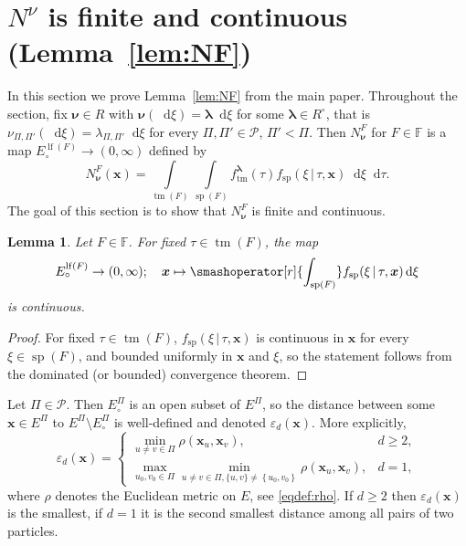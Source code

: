 \documentclass[reqno,draft]{amsart}
\numberwithin{equation}{section}
\theoremstyle{plain}
\newtheorem{lemma}[theorem]{Lemma}
\theoremstyle{remark}
\newcommand*\diff{\mathop{}\!\mathrm{d}}
\newcommand{\fpart}{\Pi} %
\newcommand{\rates}{R^\circ} %
\newcommand{\nurates}{R} %
\DeclareMathOperator{\lf}{lf}
\DeclareMathOperator{\dct}{tm}
\DeclareMathOperator{\dcs}{sp}
\newcommand{\ftm}{f_\mathrm{tm}^{\boldsymbol \lambda}}
\newcommand{\fsp}{f_\mathrm{sp}}
\begin{document}
\section{$N^{\nu}$ is finite and continuous (Lemma~\ref{lem:NF})}
In this section we prove Lemma~\ref{lem:NF} from the main paper.
\lemNF*
Throughout the section, fix $\boldsymbol \nu \in \nurates$ with $\boldsymbol \nu(\diff \xi) = \boldsymbol \lambda \diff \xi$ for some $\boldsymbol \lambda \in \rates$, that is $\nu_{\fpart,\fpart'}(\diff \xi) = \lambda_{\fpart,\fpart'} \diff \xi$ for every $\fpart,\fpart'\in \mathcal{P}$, $\fpart' < \fpart$. Then $N^F_{\boldsymbol \nu}$ for $F\in \mathbb{F}$ is a map $E^{\lf(F)}_\circ \to (0,\infty)$ defined by \[
    N^F_{\boldsymbol \nu}(\boldsymbol x) = \int\limits_{\dct(F)} \int\limits_{\dcs(F)} \ftm(\tau) \fsp(\xi \,\vert\,\tau,\boldsymbol x) \diff \xi \diff \tau.
\] The goal of this section is to show that $N^F_{\boldsymbol \nu}$ is finite and continuous.
\begin{lemma}\label{lem:NFinnerintegralcontinuous}
    Let $F\in \mathbb{F}$. For fixed $\tau \in \dct(F)$, the map \[
        E^{\lf(F)}_\circ \to (0,\infty);\quad \boldsymbol x \mapsto \smashoperator[r]{\int_{\dcs(F)}} \fsp(\xi \,\vert\,\tau,\boldsymbol x) \diff \xi
    \] is continuous.
\end{lemma}
\begin{proof}
    For fixed $\tau \in \dct(F)$, $\fsp(\xi \,\vert\,\tau,\boldsymbol x)$ is continuous in $\boldsymbol x$ for every $\xi \in \dcs(F)$, and bounded uniformly in $\boldsymbol x$ and $\xi$, so the statement follows from the dominated (or bounded) convergence theorem.
\end{proof}

Let $\fpart\in \mathcal{P}$. Then $E^{\fpart}_\circ $ is an open subset of $E^\fpart$, so the distance between some $\boldsymbol x\in E^\fpart$ to $E^\fpart \setminus E^\fpart_\circ $ is well-defined and denoted $\varepsilon_d(\boldsymbol x)$. More explicitly,
\begin{equation}\label{eq:epsd}
    \varepsilon_d(\boldsymbol x) =
    \begin{cases}
        \min_{u\neq v\in \fpart} \rho(\boldsymbol x_u , \boldsymbol x_v), & d \ge 2,\\
        \max_{u_0,v_0\in \fpart} \min_{u\neq v\in \fpart, \{ u,v \} \neq \left\{ u_0,v_0 \right\} } \rho(\boldsymbol x_{u},\boldsymbol x_{v}), & d = 1,
    \end{cases}
\end{equation}
where $\rho$ denotes the Euclidean metric on $E$, see \eqref{eqdef:rho}.
If $d\ge 2$ then $\varepsilon_d(\boldsymbol x)$ is the smallest, if $d = 1$ it is the second smallest distance among all pairs of two particles. %
\end{document}

